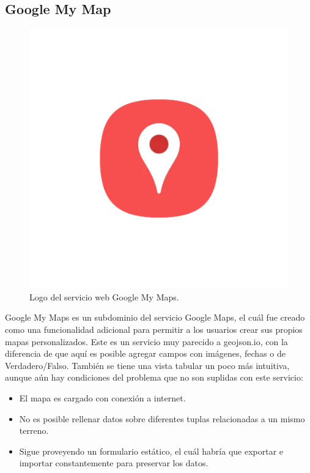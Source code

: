 \subsection{Google My Map}
\begin{figure}[h]
    \centering
    \includegraphics[scale=0.5]{Graphics/google_my_maps_logo.png}
    \caption{Logo del servicio web Google My Maps.}
    \label{fig:figura5}
\end{figure}
Google My Maps \cite{googleMyMaps} es un subdominio del servicio Google Maps, el cuál fue creado como una funcionalidad adicional para permitir a los usuarios
crear sus propios mapas personalizados. Este es un servicio muy parecido a geojson.io, con la diferencia de que aquí es posible agregar campos con imágenes, fechas o de Verdadero/Falso.
También se tiene una vista tabular un poco más intuitiva, aunque aún hay condiciones del problema que no son suplidas con este servicio:
\begin{itemize}
    \item El mapa es cargado con conexión a internet.
    \item No es posible rellenar datos sobre diferentes tuplas relacionadas a un mismo terreno.
    \item Sigue proveyendo un formulario estático, el cuál habría que exportar e importar constantemente para preservar los datos.
\end{itemize}
